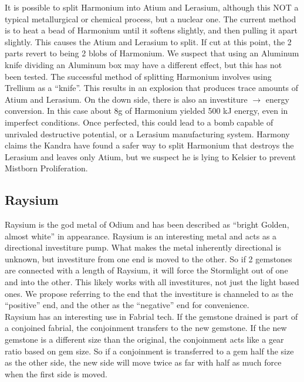 \documentclass[conference]{IEEEtran}
\begin{document}
It is possible to split Harmonium into Atium and Lerasium,\cite{TLM-CH71} although this NOT a typical metallurgical or chemical process, but a nuclear one.
\cite{TLM-CH17} The current method is to heat a bead of Harmonium until it softens slightly, and then pulling it apart slightly.  This causes the Atium and Lerasium to split.  If cut at this point, the 2 parts revert to being 2 blobs of Harmonium.\cite{TLM-CH16}  We suspect that using an Aluminum knife dividing an Aluminum box may have a different effect, but this has not been tested.  The successful method of splitting Harmonium involves using Trellium as a ``knife''.\cite{TLM-CH16}  This results in an explosion that produces trace amounts of Atium and Lerasium.\cite{TLM-CH17}\cite{TLM-CH71}  On the down side, there is also an investiture $\rightarrow$ energy conversion.  In this case about 8g of Harmonium yielded 500 kJ energy, even in imperfect conditions.  Once perfected, this could lead to a bomb capable of unrivaled destructive potential,\cite{TLM-CH71} or a Lerasium manufacturing system.  Harmony claims the Kandra have found a safer way to split Harmonium that destroys the Lerasium and leaves only Atium,\cite{TLM-3WAD} but we suspect he is lying to Kelsier to prevent Mistborn Proliferation.


\subsection*{\textbf{Raysium}\cite{rayse}}
Raysium is the god metal of Odium and has been described as ``bright Golden, almost white'' in appearance.\cite{RoW-CH84}  Raysium is an interesting metal and acts as a directional investiture pump.  What makes the metal inherently directional is unknown, but investiture from one end is moved to the other.  So if 2 gemstones are connected with a length of Raysium, it will force the Stormlight out of one and into the other.  This likely works with all investitures, not just the light based ones.\cite{RoW-CH84}  We propose referring to the end that the investiture is channeled to as the ``positive'' end, and the other as the ``negative'' end for convenience.\\

Raysium has an interesting use in Fabrial tech.  If the gemstone drained is part of a conjoined fabrial, the conjoinment transfers to the new gemstone.  If the new gemstone is a different size than the original, the conjoinment acts like a gear ratio based on gem size.  So if a conjoinment is transferred to a gem half the size as the other side, the new side will move twice as far with half as much force when the first side is moved.\cite{RoW-CH84}\\
\end{document}
